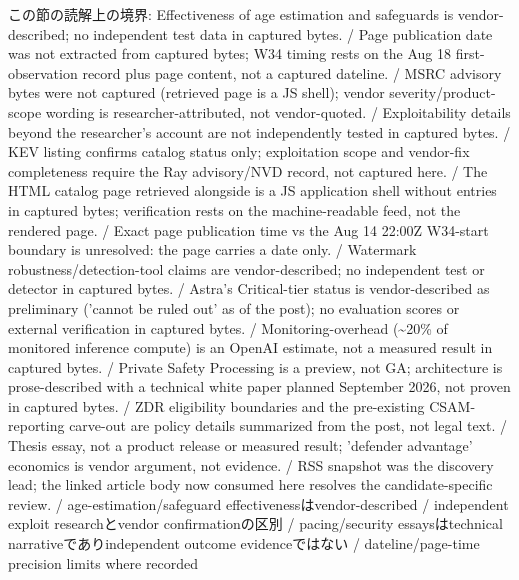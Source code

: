 \begin{claimboundary}[読解上の境界]
この節の読解上の境界: Effectiveness of age estimation and safeguards is vendor-described; no independent test data in captured bytes. / Page publication date was not extracted from captured bytes; W34 timing rests on the Aug 18 first-observation record plus page content, not a captured dateline. / MSRC advisory bytes were not captured (retrieved page is a JS shell); vendor severity/product-scope wording is researcher-attributed, not vendor-quoted. / Exploitability details beyond the researcher's account are not independently tested in captured bytes. / KEV listing confirms catalog status only; exploitation scope and vendor-fix completeness require the Ray advisory/NVD record, not captured here. / The HTML catalog page retrieved alongside is a JS application shell without entries in captured bytes; verification rests on the machine-readable feed, not the rendered page. / Exact page publication time vs the Aug 14 22:00Z W34-start boundary is unresolved: the page carries a date only. / Watermark robustness/detection-tool claims are vendor-described; no independent test or detector in captured bytes. / Astra's Critical-tier status is vendor-described as preliminary ('cannot be ruled out' as of the post); no evaluation scores or external verification in captured bytes. / Monitoring-overhead (\textasciitilde{}20\% of monitored inference compute) is an OpenAI estimate, not a measured result in captured bytes. / Private Safety Processing is a preview, not GA; architecture is prose-described with a technical white paper planned September 2026, not proven in captured bytes. / ZDR eligibility boundaries and the pre-existing CSAM-reporting carve-out are policy details summarized from the post, not legal text. / Thesis essay, not a product release or measured result; 'defender advantage' economics is vendor argument, not evidence. / RSS snapshot was the discovery lead; the linked article body now consumed here resolves the candidate-specific review. / age-estimation/safeguard effectivenessはvendor-described / independent exploit researchとvendor confirmationの区別 / pacing/security essaysはtechnical narrativeでありindependent outcome evidenceではない / dateline/page-time precision limits where recorded
\end{claimboundary}
